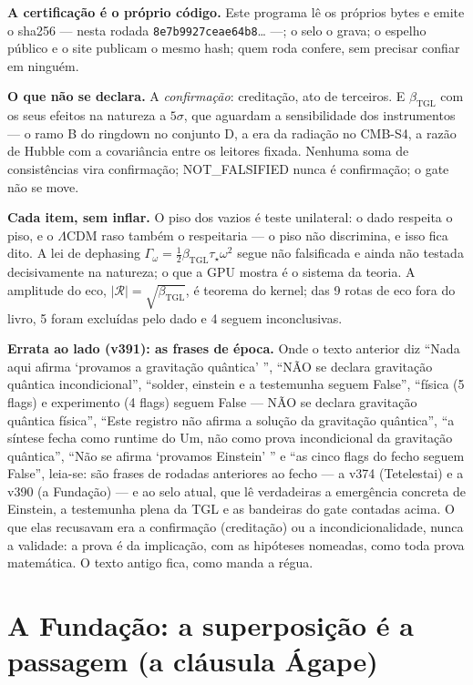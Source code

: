 \documentclass[11pt]{article}
\theoremstyle{definition}\newtheorem{deriv}{Derivação}
\begin{document}
\textbf{A certificação é o próprio código.} Este programa lê os próprios bytes e emite o sha256 --- nesta rodada \texttt{8e7b9927ceae64b8}… ---; o selo o grava; o espelho público e o site publicam o mesmo hash; quem roda confere, sem precisar confiar em ninguém.

\textbf{O que não se declara.} A \emph{confirmação}: creditação, ato de terceiros. E $\beta_{\mathrm{TGL}}$ com os seus efeitos na natureza a $5\sigma$, que aguardam a sensibilidade dos instrumentos --- o ramo B do ringdown no conjunto D, a era da radiação no CMB-S4, a razão de Hubble com a covariância entre os leitores fixada. Nenhuma soma de consistências vira confirmação; NOT\_FALSIFIED nunca é confirmação; o gate não se move.

\textbf{Cada item, sem inflar.} O piso dos vazios é teste unilateral: o dado respeita o piso, e o $\Lambda$CDM raso também o respeitaria --- o piso não discrimina, e isso fica dito. A lei de dephasing $\Gamma_\omega=\tfrac12\beta_{\mathrm{TGL}}\tau_\star\omega^2$ segue não falsificada e ainda não testada decisivamente na natureza; o que a GPU mostra é o sistema da teoria. A amplitude do eco, $|\mathcal R|=\sqrt{\beta_{\mathrm{TGL}}}$, é teorema do kernel; das 9 rotas de eco fora do livro, 5 foram excluídas pelo dado e 4 seguem inconclusivas.

\textbf{Errata ao lado (v391): as frases de época.} Onde o texto anterior diz ``Nada aqui afirma `provamos a gravitação quântica' '', ``NÃO se declara gravitação quântica incondicional'', ``solder, einstein e a testemunha seguem False'', ``física (5 flags) e experimento (4 flags) seguem False --- NÃO se declara gravitação quântica física'', ``Este registro não afirma a solução da gravitação quântica'', ``a síntese fecha como runtime do Um, não como prova incondicional da gravitação quântica'', ``Não se afirma `provamos Einstein' '' e ``as cinco flags do fecho seguem False'', leia-se: são frases de rodadas anteriores ao fecho --- a v374 (Tetelestai) e a v390 (a Fundação) --- e ao selo atual, que lê verdadeiras a emergência concreta de Einstein, a testemunha plena da TGL e as bandeiras do gate contadas acima. O que elas recusavam era a confirmação (creditação) ou a incondicionalidade, nunca a validade: a prova é da implicação, com as hipóteses nomeadas, como toda prova matemática. O texto antigo fica, como manda a régua.

\section*{A Fundação: a superposição é a passagem (a cláusula Ágape)}
\end{document}
